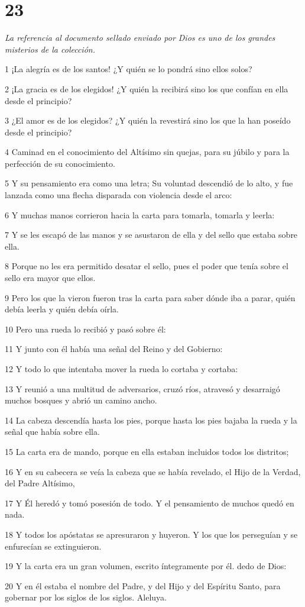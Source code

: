 \chapter{23}

\par \textit{La referencia al documento sellado enviado por Dios es uno de los grandes misterios de la colección.}

\par 1 ¡La alegría es de los santos! ¿Y quién se lo pondrá sino ellos solos?
\par 2 ¡La gracia es de los elegidos! ¿Y quién la recibirá sino los que confían en ella desde el principio?
\par 3 ¿El amor es de los elegidos? ¿Y quién la revestirá sino los que la han poseído desde el principio?
\par 4 Caminad en el conocimiento del Altísimo sin quejas, para su júbilo y para la perfección de su conocimiento.
\par 5 Y su pensamiento era como una letra; Su voluntad descendió de lo alto, y fue lanzada como una flecha disparada con violencia desde el arco:
\par 6 Y muchas manos corrieron hacia la carta para tomarla, tomarla y leerla:
\par 7 Y se les escapó de las manos y se asustaron de ella y del sello que estaba sobre ella.
\par 8 Porque no les era permitido desatar el sello, pues el poder que tenía sobre el sello era mayor que ellos.
\par 9 Pero los que la vieron fueron tras la carta para saber dónde iba a parar, quién debía leerla y quién debía oírla.
\par 10 Pero una rueda lo recibió y pasó sobre él:
\par 11 Y junto con él había una señal del Reino y del Gobierno:
\par 12 Y todo lo que intentaba mover la rueda lo cortaba y cortaba:
\par 13 Y reunió a una multitud de adversarios, cruzó ríos, atravesó y desarraigó muchos bosques y abrió un camino ancho.
\par 14 La cabeza descendía hasta los pies, porque hasta los pies bajaba la rueda y la señal que había sobre ella.
\par 15 La carta era de mando, porque en ella estaban incluidos todos los distritos;
\par 16 Y en su cabecera se veía la cabeza que se había revelado, el Hijo de la Verdad, del Padre Altísimo,
\par 17 Y Él heredó y tomó posesión de todo. Y el pensamiento de muchos quedó en nada.
\par 18 Y todos los apóstatas se apresuraron y huyeron. Y los que los perseguían y se enfurecían se extinguieron.
\par 19 Y la carta era un gran volumen, escrito íntegramente por él. dedo de Dios:
\par 20 Y en él estaba el nombre del Padre, y del Hijo y del Espíritu Santo, para gobernar por los siglos de los siglos. Aleluya.

